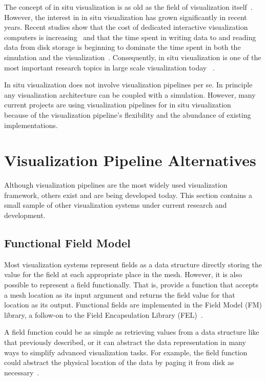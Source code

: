 \documentclass[journal,onecolumn,12pt,letterpaper,twoside]{IEEEtran}
\newcommand*{\lcite}[1]{~\cite{#1}}
\begin{document}
The concept of in situ visualization is as old as the field of
visualization itself\lcite{ViSC1987}.  However, the interest in in situ
visualization has grown significantly in recent years.  Recent studies show
that the cost of dedicated interactive visualization computers is
increasing\lcite{Childs2007} and that the time spent in writing data to and
reading data from disk storage is beginning to dominate the time spent in
both the simulation and the
visualization\lcite{Ross2008,Peterka2008,Peterka2009}.  Consequently, in
situ visualization is one of the most important research topics in large
scale visualization today%
\lcite{VisualizationKnowledgeDiscovery2007,ScientificDiscoveryExascale2011}.

In situ visualization does not involve visualization pipelines per se.  In
principle any visualization architecture can be coupled with a simulation.
However, many current projects are using visualization pipelines for in
situ visualization%
\lcite{Biddiscombe2011,Fabian2011,Johnson1999,Klasky2011,Moreland2011:PDAC,VisItLibsim}
because of the visualization pipeline's flexibility and the abundance of
existing implementations.


\section{Visualization Pipeline Alternatives}
\label{sec:Alternatives}

Although visualization pipelines are the most widely used visualization
framework, others exist and are being developed today.  This section
contains a small sample of other visualization systems under current
research and development.

\subsection{Functional Field Model}
\label{sec:FunctionalFieldModel}

Most visualization systems represent fields as a data structure directly
storing the value for the field at each appropriate place in the mesh.
However, it is also possible to represent a field functionally.  That is,
provide a function that accepts a mesh location as its input argument and
returns the field value for that location as its output.  Functional fields
are implemented in the Field Model (FM) library, a follow-on to the Field
Encapsulation Library (FEL)\lcite{FELPaper}.

A field function could be as simple as retrieving values from a data
structure like that previously described, or it can abstract the data
representation in many ways to simplify advanced visualization tasks.  For
example, the field function could abstract the physical location of the
data by paging it from disk as necessary\lcite{Cox1997}.
\end{document}
